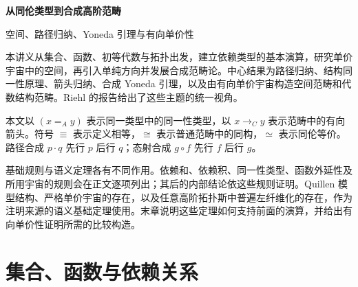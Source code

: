 \documentclass[12pt,oneside,openany,fontset=none]{ctexbook}
\theoremstyle{cn}
\numberwithin{equation}{chapter}
\begin{document}
\begin{center}
{\LARGE\bfseries 从同伦类型到合成高阶范畴\par}
\vspace{6pt}
{\large 空间、路径归纳、Yoneda 引理与有向单价性\par}
\end{center}
\vspace{8pt}
\noindent 本讲义从集合、函数、初等代数与拓扑出发，建立依赖类型的基本演算，研究单价宇宙中的空间，再引入单纯方向并发展合成范畴论。中心结果为路径归纳、结构同一性原理、箭头归纳、合成 Yoneda 引理，以及由有向单价宇宙构造空间范畴和代数结构范畴。Riehl 的报告\cite{RiehlICM}给出了这些主题的统一视角。

\noindent 本文以 $(x=_A y)$ 表示同一类型中的同一性类型，以 $x\to_C y$ 表示范畴中的有向箭头。符号 $\equiv$ 表示定义相等，$\cong$ 表示普通范畴中的同构，$\simeq$ 表示同伦等价。路径合成 $p\cdot q$ 先行 $p$ 后行 $q$；态射合成 $g\circ f$ 先行 $f$ 后行 $g$。

\noindent 基础规则与语义定理各有不同作用。依赖和、依赖积、同一性类型、函数外延性及所用宇宙的规则会在正文逐项列出；其后的内部结论依这些规则证明。Quillen 模型结构、严格单价宇宙的存在，以及任意高阶拓扑斯中普遍左纤维化的存在，作为注明来源的语义基础定理使用。末章说明这些定理如何支持前面的演算，并给出有向单价性证明所需的比较构造。

\setcounter{tocdepth}{1}
\tableofcontents

\chapter{集合、函数与依赖关系}
\end{document}
